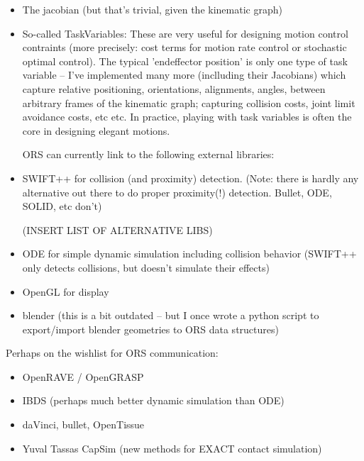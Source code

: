 \begin{itemize}
\item The jacobian (but that's trivial, given the kinematic graph)

\item So-called TaskVariables: These are very useful for designing motion
   control contraints (more precisely: cost terms for motion rate
   control or stochastic optimal control). The typical 'endeffector
   position' is only one type of task variable -- I've implemented
   many more (inclluding their Jacobians) which capture relative
   positioning, orientations, alignments, angles, between arbitrary
   frames of the kinematic graph; capturing collision costs, joint
   limit avoidance costs, etc etc. In practice, playing with task
   variables is often the core in designing elegant motions.

   ORS can currently link to the following external libraries:


\item SWIFT++ for collision (and proximity) detection. (Note: there is
   hardly any alternative out there to do proper proximity(!)
   detection. Bullet, ODE, SOLID, etc don't)

   (INSERT LIST OF ALTERNATIVE LIBS)

\item ODE for simple dynamic simulation including collision behavior
   (SWIFT++ only detects collisions, but doesn't simulate their
   effects)

\item OpenGL for display

\item blender (this is a bit outdated -- but I once wrote a python script
   to export/import blender geometries to ORS data structures)
\end{itemize}

Perhaps on the wishlist for ORS communication:
\begin{itemize}
\item OpenRAVE /  OpenGRASP

\item IBDS (perhaps much better dynamic simulation than ODE)

\item daVinci, bullet, OpenTissue

\item Yuval Tassas CapSim (new methods for EXACT contact simulation)
\end{itemize}

